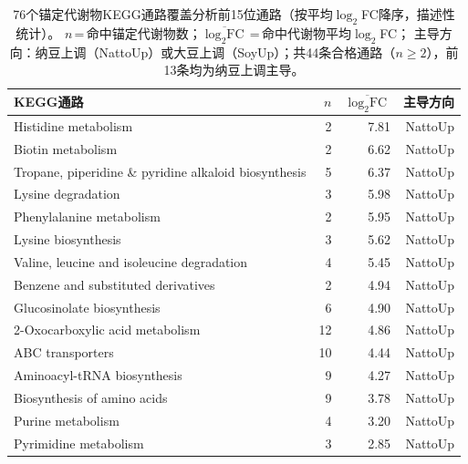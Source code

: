 \documentclass[10pt, a4paper, twocolumn]{ctexart}
\begin{document}
\begin{table}[h!]
\caption{76个锚定代谢物KEGG通路覆盖分析前15位通路（按平均$\log_2$FC降序，描述性统计）。
  $n$\,=\,命中锚定代谢物数；$\overline{\log_2\text{FC}}$\,=\,命中代谢物平均$\log_2$FC；
  主导方向：纳豆上调（NattoUp）或大豆上调（SoyUp）；共44条合格通路（$n\geq 2$），前13条均为纳豆上调主导。}
\label{tab:pathway_enrich}
\small
\centering
\begin{tabular}{lrrr}
\toprule
\textbf{KEGG通路} & \textbf{$n$} &
\textbf{$\overline{\log_2\text{FC}}$} & \textbf{主导方向} \\
\midrule
Histidine metabolism                                    & 2  & 7.81 & NattoUp \\
Biotin metabolism                                       & 2  & 6.62 & NattoUp \\
Tropane, piperidine \& pyridine alkaloid biosynthesis   & 5  & 6.37 & NattoUp \\
Lysine degradation                                      & 3  & 5.98 & NattoUp \\
Phenylalanine metabolism                                & 2  & 5.95 & NattoUp \\
Lysine biosynthesis                                     & 3  & 5.62 & NattoUp \\
Valine, leucine and isoleucine degradation              & 4  & 5.45 & NattoUp \\
Benzene and substituted derivatives                     & 2  & 4.94 & NattoUp \\
Glucosinolate biosynthesis                              & 6  & 4.90 & NattoUp \\
2-Oxocarboxylic acid metabolism                         & 12 & 4.86 & NattoUp \\
ABC transporters                                        & 10 & 4.44 & NattoUp \\
Aminoacyl-tRNA biosynthesis                             & 9  & 4.27 & NattoUp \\
Biosynthesis of amino acids                             & 9  & 3.78 & NattoUp \\
Purine metabolism                                       & 4  & 3.20 & NattoUp \\
Pyrimidine metabolism                                   & 3  & 2.85 & NattoUp \\
\bottomrule
\end{tabular}
\end{table}
\end{document}
